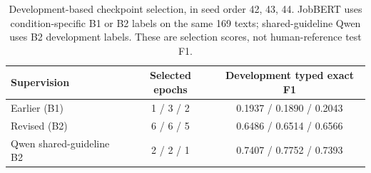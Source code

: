 \begin{table}[htbp]
\caption{Development-based checkpoint selection, in seed order 42, 43, 44. JobBERT uses condition-specific B1 or B2 labels on the same 169 texts; shared-guideline Qwen uses B2 development labels. These are selection scores, not human-reference test F1.}
\label{tab:selection-v6a-r41}
\centering\small
\begin{tabular}{@{}lcc@{}}
\toprule
Supervision & Selected epochs & Development typed exact F1 \\
\midrule
Earlier (B1) & 1 / 3 / 2 & 0.1937 / 0.1890 / 0.2043 \\
Revised (B2) & 6 / 6 / 5 & 0.6486 / 0.6514 / 0.6566 \\
\midrule
Qwen shared-guideline B2 & 2 / 2 / 1 & 0.7407 / 0.7752 / 0.7393 \\
\bottomrule
\end{tabular}
\end{table}

